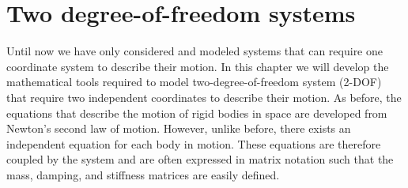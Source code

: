 \documentclass[12pt,letter]{article}
\numberwithin{ex}{section} %
\numberwithin{re}{section} %
\begin{document}
\setcounter{section}{4}	
\section{Two degree-of-freedom systems}

Until now we have only considered and modeled systems that can require one coordinate system to describe their motion. In this chapter we will develop the mathematical tools required to model two-degree-of-freedom system (2-DOF) that require two independent coordinates to describe their motion. As before, the equations that describe the motion of rigid bodies in space are developed from Newton's second law of motion. However, unlike before, there exists an independent equation for each body in motion. These equations are therefore coupled by the system and are often expressed in matrix notation such that the mass, damping, and stiffness matrices are easily defined. 
\end{document}

